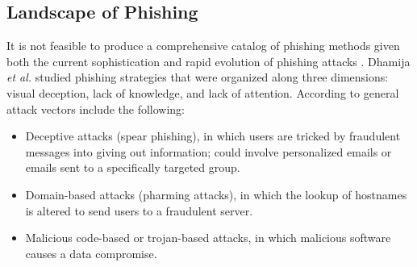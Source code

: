 \documentclass[english,gradu]{tktltiki}
\begin{document}


\subsection{Landscape of Phishing}

              It is not feasible to produce a comprehensive catalog of phishing methods given both the current sophistication and rapid evolution of phishing attacks \cite{phishing_attacks_and_solutions_2007}. Dhamija
          \emph{et al.} \cite{why_phishing_works_06} studied phishing strategies that were organized along three dimensions: visual deception, lack of knowledge, and lack of attention. According to \cite{phishing_attacks_and_solutions_2007, suspectibility_to_phishing_2006} general attack vectors include the following:

          \begin{itemize}

            \item{Deceptive attacks (spear phishing),
                      in which users are tricked by fraudulent messages into giving out
                      information; could involve personalized emails or emails sent to a specifically
                      targeted group.
                    }

            \item{Domain-based attacks (pharming attacks),
                      in which the lookup of hostnames is altered to send users to a
                      fraudulent server.
                    }

            \item{Malicious code-based or trojan-based attacks,
                        in which malicious software causes a data compromise.
                    }

          \end{itemize}
\end{document}
